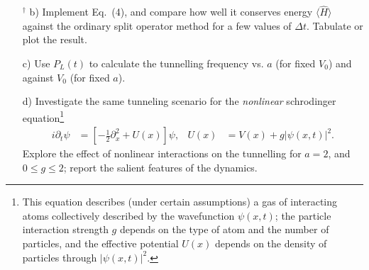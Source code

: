 \documentclass[11pt]{article}
\begin{document}
\begin{enumerate}
\item[$^\dagger$ b)]  Implement Eq.~(4), and compare how well it conserves energy $\langle \hat H \rangle$ against the ordinary split operator method for a few values of $\Delta t$. Tabulate or plot the result.

\item [c)]  Use $P_L(t)$ to calculate the tunnelling frequency vs. $ a$ (for fixed $V_0$) and against $V_0$ (for fixed $a$).

\item [d)] Investigate the same tunneling scenario for the \emph{nonlinear} schrodinger equation\footnote[1]{This equation describes (under certain assumptions) a gas of interacting atoms collectively described by the wavefunction $\psi(x,t)$; the particle interaction strength $g$ depends on the type of atom and the number of particles, and the effective potential $U(x)$ depends on the density of particles through $|\psi(x,t)|^2$.} 
\begin{align}
i\partial_t \psi &= [-\tfrac{1}{2} \partial_x^2 + U(x)] \psi, &U (x) &=  V(x) + g |\psi(x,t)|^2.
\end{align}
 Explore the effect of nonlinear interactions on the tunnelling for $a =2$, and $ 0 \leq g \leq 2$; report the salient features of the dynamics.

\end{enumerate}
\vspace{1cm}


%

\end{document}
